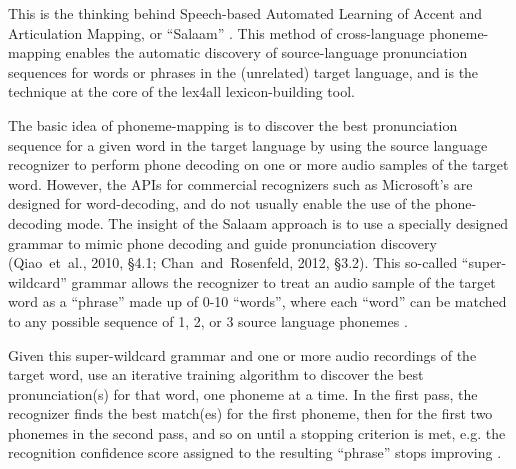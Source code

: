 \documentclass[11pt]{article}
\begin{document}



This is the thinking behind Speech-based Automated Learning of Accent and Articulation Mapping, or ``Salaam'' \cite{Sherwani09,Qiao10,Chan12}. This method of cross-language phoneme-mapping enables the automatic discovery of source-language pronunciation sequences for words or phrases in the (unrelated) target language, and 
is the technique at the core of the lex4all lexicon-building tool.

The basic idea of phoneme-mapping is to discover the best pronunciation sequence for a given word in the target language by using the source language recognizer to perform phone decoding on one or more audio samples of the target word. However, the APIs for commercial recognizers such as Microsoft's are designed for word-decoding, and do not usually enable the use of the phone-decoding mode. The insight of the Salaam approach is to use a specially designed grammar 
to mimic phone decoding 
and guide pronunciation discovery 
(Qiao~et~al., 2010, \S4.1; Chan~and~Rosenfeld, 2012, \S3.2).
This so-called ``super-wildcard'' grammar allows the recognizer to treat an audio sample of the target word as a ``phrase'' made up of 0-10 ``words'',
where each ``word'' can be matched to any possible sequence of 1, 2, or 3 source language phonemes \cite[\S4.1]{Qiao10}. 

Given this super-wildcard grammar and one or more audio recordings of the target word,  use an iterative training algorithm to discover the best pronunciation(s) for that word, one phoneme at a time. 
In the first pass, the recognizer finds the best match(es) for the first phoneme, then for the first two phonemes in the second pass, and so on until a stopping criterion is met, e.g. the recognition confidence score assigned to the resulting ``phrase'' stops improving \cite[p.~4]{Qiao10}.
\end{document}

